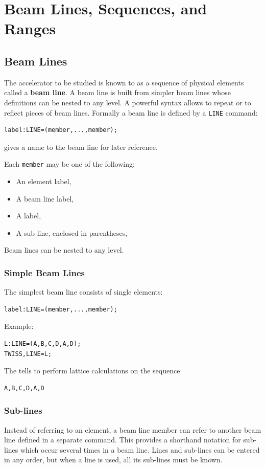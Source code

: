 \chapter{Beam Lines, Sequences, and Ranges}
\label{chp:lines}

\section{Beam Lines}
\label{sec:line}

The accelerator to be studied is known to \opal
as a sequence of physical elements called a \textbf{beam line}.
A beam line is built from simpler beam lines whose definitions
can be nested to any level.
A powerful syntax allows to repeat or to reflect pieces of beam lines.
Formally a beam line is defined by a \texttt{LINE} command:
\begin{verbatim}
label:LINE=(member,...,member);
\end{verbatim}
 gives a name to the beam line 
for later reference.

Each \texttt{member} may be one of the following:
\begin{itemize}
\item An element label,
\item A beam line label,
\item A  label,
\item A sub-line, enclosed in parentheses,
\end{itemize}
Beam lines can be nested to any level.

\subsection{Simple Beam Lines}
\label{sec:simple}
The simplest beam line consists of single elements:
\begin{verbatim}
label:LINE=(member,...,member);
\end{verbatim}
Example:
\begin{verbatim}
L:LINE=(A,B,C,D,A,D);
TWISS,LINE=L;
\end{verbatim}
The  tells \opal to perform
lattice calculations on the sequence 
\begin{verbatim}
A,B,C,D,A,D
\end{verbatim}

\subsection{Sub-lines}
\label{sec:subline}
Instead of referring to an element,
a beam line member can refer to another beam line
defined in a separate command.
This provides a shorthand notation for sub-lines which occur
several times in a beam line.
Lines and sub-lines can be entered in any order,
but when a line is used,
all its sub-lines must be known.

